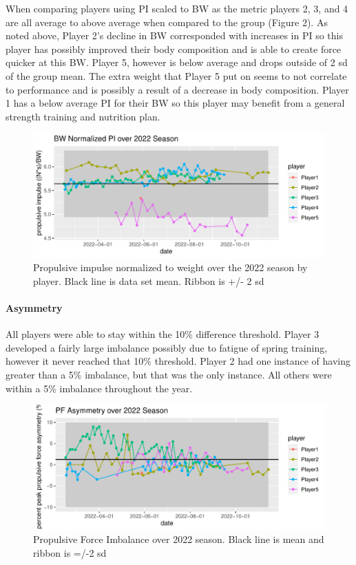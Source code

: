 \documentclass[
  12pt,
]{article}
\begin{document}
When comparing players using PI scaled to BW as the metric players 2, 3,
and 4 are all average to above average when compared to the group
(Figure 2). As noted above, Player 2's decline in BW corresponded with
increases in PI so this player has possibly improved their body
composition and is able to create force quicker at this BW. Player 5,
however is below average and drops outside of 2 sd of the group mean.
The extra weight that Player 5 put on seems to not correlate to
performance and is possibly a result of a decrease in body composition.
Player 1 has a below average PI for their BW so this player may benefit
from a general strength training and nutrition plan.

\begin{figure}
\centering
\includegraphics{report_code_files/figure-latex/propulsive impulse-1.pdf}
\caption{Propulsive impulse normalized to weight over the 2022 season by
player. Black line is data set mean. Ribbon is +/- 2 sd}
\end{figure}

\hypertarget{asymmetry}{%
\paragraph{Asymmetry}\label{asymmetry}}

All players were able to stay within the 10\% difference threshold.
Player 3 developed a fairly large imbalance possibly due to fatigue of
spring training, however it never reached that 10\% threshold. Player 2
had one instance of having greater than a 5\% imbalance, but that was
the only instance. All others were within a 5\% imbalance throughout the
year.

\begin{figure}
\centering
\includegraphics{report_code_files/figure-latex/imbalance-1.pdf}
\caption{Propulsive Force Imbalance over 2022 season. Black line is mean
and ribbon is =/-2 sd}
\end{figure}
\end{document}
